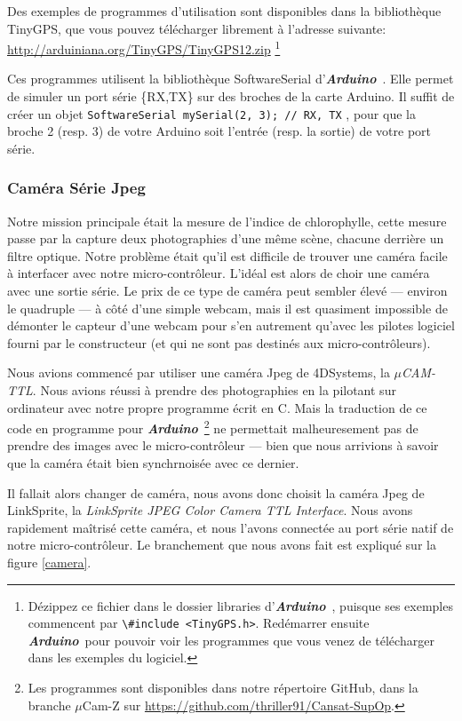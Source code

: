 \documentclass[twocolumn, 8pt]{article}
\newcommand\Ard{\textbf{\emph{Arduino}}~}
\begin{document}
\par Des exemples de programmes d'utilisation sont disponibles dans la bibliothèque \textsf{TinyGPS}, que vous pouvez télécharger librement à l'adresse suivante: \url{http://arduiniana.org/TinyGPS/TinyGPS12.zip} \footnote{Dézippez ce fichier dans le dossier \textsf{libraries} d'\Ard, puisque ses exemples commencent par \lstinline$\#include <TinyGPS.h>$. Redémarrer ensuite \Ard pour pouvoir voir les programmes que vous venez de télécharger dans les exemples du logiciel.}
\par Ces programmes utilisent la bibliothèque \textsf{SoftwareSerial} d'\Ard. Elle permet de simuler un port série \{RX,TX\} sur des broches de la carte Arduino. Il suffit de créer un objet \lstinline$SoftwareSerial mySerial(2, 3); // RX, TX$ , pour que la broche \no{}2 (resp. \no{}3) de votre Arduino soit l'entrée (resp. la sortie) de votre port série.

\subsubsection{Caméra Série Jpeg}
\par Notre mission principale était la mesure de l'indice de chlorophylle, cette mesure passe par la capture deux photographies d'une même scène, chacune derrière un filtre optique. Notre problème était qu'il est difficile de trouver une caméra facile à interfacer avec notre micro-contrôleur. L'idéal est alors de choir une caméra avec une sortie série. Le prix de ce type de caméra peut sembler élevé --- environ le quadruple --- à côté d'une simple webcam, mais il est quasiment impossible de démonter le capteur d'une webcam pour s'en autrement qu'avec les pilotes logiciel fourni par le constructeur (et qui ne sont pas destinés aux micro-contrôleurs).
\par Nous avions commencé par utiliser une caméra Jpeg de 4DSystems, la \emph{$\mu$CAM-TTL}. Nous avions réussi à prendre des photographies en la pilotant sur ordinateur avec notre propre programme écrit en C. Mais la traduction de ce code en programme pour \Ard \footnote{Les programmes sont disponibles dans notre répertoire GitHub, dans la branche \textsf{$\mu$Cam-Z} sur \url{https://github.com/thriller91/Cansat-SupOp}.} ne permettait malheuresement pas de prendre des images avec le micro-contrôleur --- bien que nous arrivions à savoir que la caméra était bien synchrnoisée avec ce dernier.
\par Il fallait alors changer de caméra, nous avons donc choisit la caméra Jpeg de LinkSprite, la \emph{LinkSprite JPEG Color Camera TTL Interface}. Nous avons rapidement maîtrisé cette caméra, et nous l'avons connectée au port série natif de notre micro-contrôleur. Le branchement que nous avons fait est expliqué sur la figure \ref{camera}.
\end{document}
